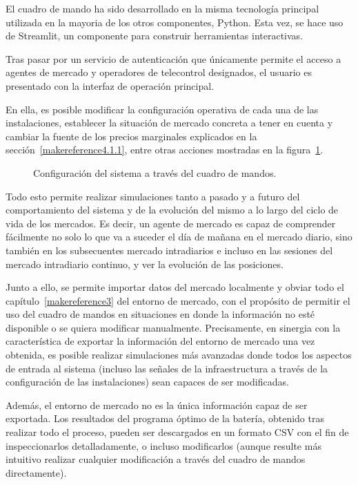  El cuadro de mando ha sido desarrollado en la misma tecnología principal utilizada en la mayoria de los otros componentes, Python. Esta vez, se hace uso de Streamlit, un componente para construir herramientas interactivas.

  Tras pasar por un servicio de autenticación que únicamente permite el acceso a agentes de mercado y operadores de telecontrol designados, el usuario es presentado con la interfaz de operación principal.

  En ella, es posible modificar la configuración operativa de cada una de las instalaciones, establecer la situación de mercado concreta a tener en cuenta y cambiar la fuente de los precios marginales explicados en la sección~\ref{makereference4.1.1}, entre otras acciones mostradas en la figura~\ref{fig:configuración-sistema}.

  \begin{figure}
    \centering
    \caption[Configuración del sistema.]{Configuración del sistema a través del cuadro de mandos.}
    \label{fig:configuración-sistema}
  \end{figure}

  Todo esto permite realizar simulaciones tanto a pasado y a futuro del comportamiento del sistema y de la evolución del mismo a lo largo del ciclo de vida de los mercados. Es decir, un agente de mercado es capaz de comprender fácilmente no solo lo que va a suceder el día de mañana en el mercado diario, sino también en los subsecuentes mercado intradiarios e incluso en las sesiones del mercado intradiario continuo, y ver la evolución de las posiciones.

  Junto a ello, se permite importar datos del mercado localmente y obviar todo el capítulo~\ref{makereference3} del entorno de mercado, con el propósito de permitir el uso del cuadro de mandos en situaciones en donde la información no esté disponible o se quiera modificar manualmente. Precisamente, en sinergia con la característica de exportar la información del entorno de mercado una vez obtenida, es posible realizar simulaciones más avanzadas donde todos los aspectos de entrada al sistema (incluso las señales de la infraestructura a través de la configuración de las instalaciones) sean capaces de ser modificadas.

  Además, el entorno de mercado no es la única información capaz de ser exportada. Los resultados del programa óptimo de la batería, obtenido tras realizar todo el proceso, pueden ser descargados en un formato CSV con el fin de inspeccionarlos detalladamente, o incluso modificarlos (aunque resulte más intuitivo realizar cualquier modificación a través del cuadro de mandos directamente).

